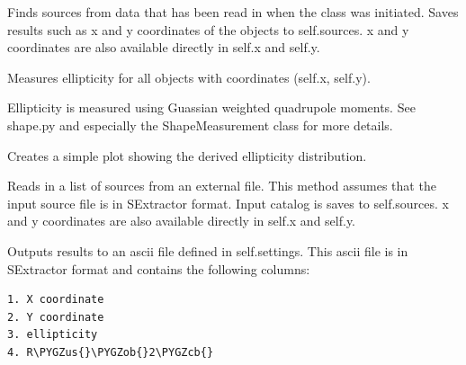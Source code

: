 \documentclass[a4paper,11pt,english]{sphinxmanual}
\def\PYGZus{\char`\_}
\def\PYGZob{\char`\{}
\def\PYGZcb{\char`\}}
\begin{document}
\begin{fulllineitems}
\begin{fulllineitems}
Finds sources from data that has been read in when the class was initiated.
Saves results such as x and y coordinates of the objects to self.sources.
x and y coordinates are also available directly in self.x and self.y.

\end{fulllineitems}


\begin{fulllineitems}
Measures ellipticity for all objects with coordinates (self.x, self.y).

Ellipticity is measured using Guassian weighted quadrupole moments.
See shape.py and especially the ShapeMeasurement class for more details.

\end{fulllineitems}


\begin{fulllineitems}
Creates a simple plot showing the derived ellipticity distribution.

\end{fulllineitems}


\begin{fulllineitems}
Reads in a list of sources from an external file. This method assumes
that the input source file is in SExtractor format. Input catalog is
saves to self.sources. x and y coordinates are also available directly in self.x and self.y.

\end{fulllineitems}


\begin{fulllineitems}
Outputs results to an ascii file defined in self.settings. This ascii file
is in SExtractor format and contains the following columns:

\begin{Verbatim}[commandchars=\\\{\}]
1. X coordinate
2. Y coordinate
3. ellipticity
4. R\PYGZus{}\PYGZob{}2\PYGZcb{}
\end{Verbatim}

\end{fulllineitems}


\end{fulllineitems}
\end{document}
